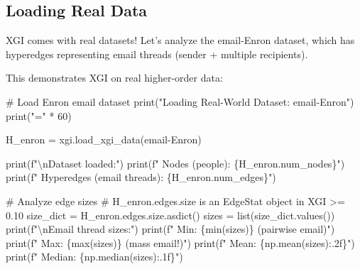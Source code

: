 \documentclass[
  11pt,
  letterpaper,
  oneside,
  openany]{book}
\newenvironment{Shaded}{\begin{snugshade}}{\end{snugshade}}
\newcommand{\BuiltInTok}[1]{\textcolor[rgb]{0.00,0.23,0.31}{#1}}
\newcommand{\CharTok}[1]{\textcolor[rgb]{0.13,0.47,0.30}{#1}}
\newcommand{\CommentTok}[1]{\textcolor[rgb]{0.37,0.37,0.37}{#1}}
\newcommand{\DecValTok}[1]{\textcolor[rgb]{0.68,0.00,0.00}{#1}}
\newcommand{\NormalTok}[1]{\textcolor[rgb]{0.00,0.23,0.31}{#1}}
\newcommand{\OperatorTok}[1]{\textcolor[rgb]{0.37,0.37,0.37}{#1}}
\newcommand{\SpecialCharTok}[1]{\textcolor[rgb]{0.37,0.37,0.37}{#1}}
\newcommand{\SpecialStringTok}[1]{\textcolor[rgb]{0.13,0.47,0.30}{#1}}
\newcommand{\StringTok}[1]{\textcolor[rgb]{0.13,0.47,0.30}{#1}}
\begin{document}
\subsection{Loading Real Data}\label{loading-real-data}

XGI comes with real datasets! Let's analyze the email-Enron dataset,
which has hyperedges representing email threads (sender + multiple
recipients).

This demonstrates XGI on real higher-order data:

\begin{Shaded}
\begin{Highlighting}[]
\CommentTok{\# Load Enron email dataset}
\BuiltInTok{print}\NormalTok{(}\StringTok{"Loading Real{-}World Dataset: email{-}Enron"}\NormalTok{)}
\BuiltInTok{print}\NormalTok{(}\StringTok{"="} \OperatorTok{*} \DecValTok{60}\NormalTok{)}

\NormalTok{H\_enron }\OperatorTok{=}\NormalTok{ xgi.load\_xgi\_data(}\StringTok{\textquotesingle{}email{-}Enron\textquotesingle{}}\NormalTok{)}

\BuiltInTok{print}\NormalTok{(}\SpecialStringTok{f"}\CharTok{\textbackslash{}n}\SpecialStringTok{Dataset loaded:"}\NormalTok{)}
\BuiltInTok{print}\NormalTok{(}\SpecialStringTok{f"  Nodes (people): }\SpecialCharTok{\{}\NormalTok{H\_enron}\SpecialCharTok{.}\NormalTok{num\_nodes}\SpecialCharTok{\}}\SpecialStringTok{"}\NormalTok{)}
\BuiltInTok{print}\NormalTok{(}\SpecialStringTok{f"  Hyperedges (email threads): }\SpecialCharTok{\{}\NormalTok{H\_enron}\SpecialCharTok{.}\NormalTok{num\_edges}\SpecialCharTok{\}}\SpecialStringTok{"}\NormalTok{)}

\CommentTok{\# Analyze edge sizes}
\CommentTok{\# H\_enron.edges.size is an EdgeStat object in XGI \textgreater{}= 0.10}
\NormalTok{size\_dict }\OperatorTok{=}\NormalTok{ H\_enron.edges.size.asdict()}
\NormalTok{sizes }\OperatorTok{=} \BuiltInTok{list}\NormalTok{(size\_dict.values())}
\BuiltInTok{print}\NormalTok{(}\SpecialStringTok{f"}\CharTok{\textbackslash{}n}\SpecialStringTok{Email thread sizes:"}\NormalTok{)}
\BuiltInTok{print}\NormalTok{(}\SpecialStringTok{f"  Min: }\SpecialCharTok{\{}\BuiltInTok{min}\NormalTok{(sizes)}\SpecialCharTok{\}}\SpecialStringTok{ (pairwise email)"}\NormalTok{)}
\BuiltInTok{print}\NormalTok{(}\SpecialStringTok{f"  Max: }\SpecialCharTok{\{}\BuiltInTok{max}\NormalTok{(sizes)}\SpecialCharTok{\}}\SpecialStringTok{ (mass email!)"}\NormalTok{)}
\BuiltInTok{print}\NormalTok{(}\SpecialStringTok{f"  Mean: }\SpecialCharTok{\{}\NormalTok{np}\SpecialCharTok{.}\NormalTok{mean(sizes)}\SpecialCharTok{:.2f\}}\SpecialStringTok{"}\NormalTok{)}
\BuiltInTok{print}\NormalTok{(}\SpecialStringTok{f"  Median: }\SpecialCharTok{\{}\NormalTok{np}\SpecialCharTok{.}\NormalTok{median(sizes)}\SpecialCharTok{:.1f\}}\SpecialStringTok{"}\NormalTok{)}


\end{Highlighting}
\end{Shaded}
\end{document}
